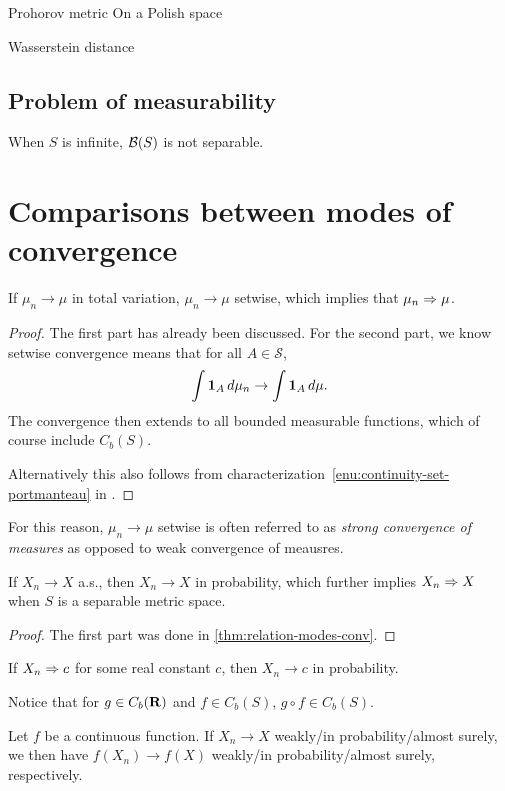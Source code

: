 Prohorov metric On a Polish space

Wasserstein distance 

\subsection{Problem of measurability}

When $S$ is infinite, $\mathcal{B}(S)$ is not separable.

\section{Comparisons between modes of convergence}
\begin{thm}
    If $\mu_n \to \mu$ in total variation, $\mu_n \to \mu$ setwise, which implies that $\mu_n \Rightarrow \mu$.
\end{thm}
\begin{proof}
    The first part has already been discussed. For the second part, we know setwise convergence means that for all $A\in \mathcal S$, \[
        \int \mathbf{1}_A \,d \mu_n \to \int \mathbf{1}_A\, d\mu.
    \] The convergence then extends to all bounded measurable functions, which of course include $C_b(S)$.
    
    Alternatively this also follows from characterization~\ref{enu:continuity-set-portmanteau} in .
\end{proof}

For this reason, $\mu_n \to \mu$ setwise is often referred to as \emph{strong convergence of measures} as opposed to weak convergence of meausres.

\begin{thm}
    If $X_n \to X$ a.s., then $X_n \to X$ in probability, which further implies $X_n \Rightarrow X$ when $S$ is a separable metric space.
\end{thm}
\begin{proof}
    The first part was done in \cref{thm:relation-modes-conv}. 
\end{proof}

\begin{thm}
    If $X_n \Rightarrow c$ for some real constant $c$, then $X_n \to c$ in probability.
\end{thm}

Notice that for $g \in C_b(\mathbf{R})$ and $f \in C_b(S)$, $g\circ f\in C_b(S)$.

\begin{namedthm} Let $f$ be a continuous function. If $X_n \to X$ weakly/in probability/almost surely, we then have $f(X_n) \to f(X)$ weakly/in probability/almost surely, respectively.
\end{namedthm}

